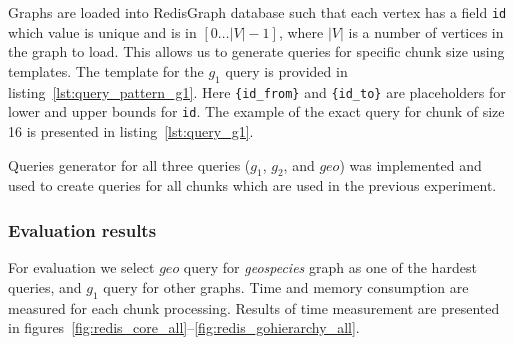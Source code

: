 Graphs are loaded into RedisGraph database such that each vertex has a field \verb|id| which value is unique and is in $[0 \ldots |V|-1]$, where $|V|$ is a number of vertices in the graph to load.
This allows us to generate queries for specific chunk size using templates.
The template for the $g_1$ query is provided in listing~\ref{lst:query_pattern_g1}.
Here \texttt{\{id\_from\}} and \texttt{\{id\_to\}} are placeholders for lower and upper bounds for \verb|id|. The example of the exact query for chunk of size 16 is presented in listing~\ref{lst:query_g1}.

\begin{algorithm}
\end{algorithm}

\begin{algorithm}
\end{algorithm}

Queries generator for all three queries ($g_1$, $g_2$, and $geo$) was implemented and used to create queries for all chunks which are used in the previous experiment. 


\subsubsection{Evaluation results}

For evaluation we select $geo$ query for \textit{geospecies} graph as one of the hardest queries, and $g_1$ query for other graphs.
Time and memory consumption are measured for each chunk processing.
Results of time measurement are presented in figures~\ref{fig:redis_core_all}--\ref{fig:redis_gohierarchy_all}.

